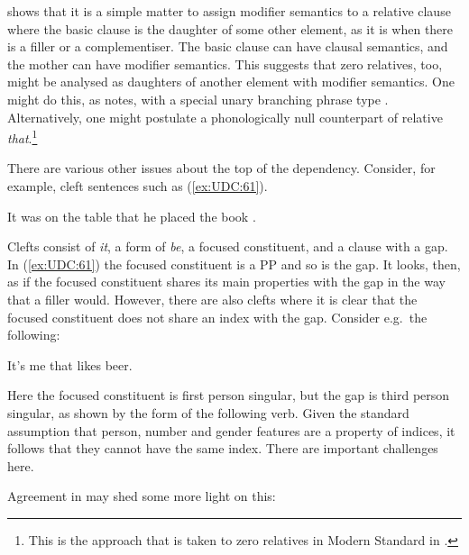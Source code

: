 \documentclass[output=paper
,notxmath 
	        ,collection
	        ,collectionchapter
 	        ,biblatex
                ,babelshorthands
                ,newtxmath
                ,draftmode
                ,colorlinks, citecolor=brown
]{langscibook}
\begin{document}
\citet[Section~5.4]{Sag:10a} shows that it is a simple matter to assign modifier semantics
to a relative clause where the basic clause is the daughter of some
other element, as it is when there is a filler or a complementiser. The
basic clause can have clausal semantics, and the mother can have modifier
semantics. This suggests that zero relatives, too, might be analysed as
daughters of another element with modifier semantics. One might do this,
as \citet[531]{Sag:10a} notes, with a special unary branching phrase
type \citep[Section~10.3.2]{Mueller99a}.
Alternatively, one might postulate a phonologically null counterpart of
relative \emph{that}.\footnote{This is the approach that is taken to
  zero relatives in Modern Standard  in \citet[Section~4]{Alqurashi:Borsley:12}.}

There are various other issues about the top of the dependency.
Consider, for example, cleft sentences such as (\ref{ex:UDC:61}).

\begin{exe}
\ex \label{ex:UDC:61}
 It was on the table that he placed the book \trace{}.
\end{exe}

\noindent
Clefts consist of \emph{it}, a form of \emph{be}, a focused constituent,
and a clause with a gap. In (\ref{ex:UDC:61}) the focused constituent is a PP and so
is the gap. It looks, then, as if the focused constituent shares its
main properties with the gap in the way that a filler would. However,
there are also clefts where it is clear that the focused constituent
does not share an index with the gap. Consider e.g.\ the following:

\begin{exe}
\ex \label{ex:UDC:62}
It's me that \trace{} likes beer.
\end{exe}

\noindent
Here the focused constituent is first person singular, but the gap is
third person singular, as shown by the form of the following verb. Given
the standard assumption that person, number and gender features are a
property of indices, it follows that they cannot have the same index.
There are important challenges here.

Agreement in  may shed some more light on this: 

\eal
\label{ex:GermanRelAgr}
\zl
\end{document}

